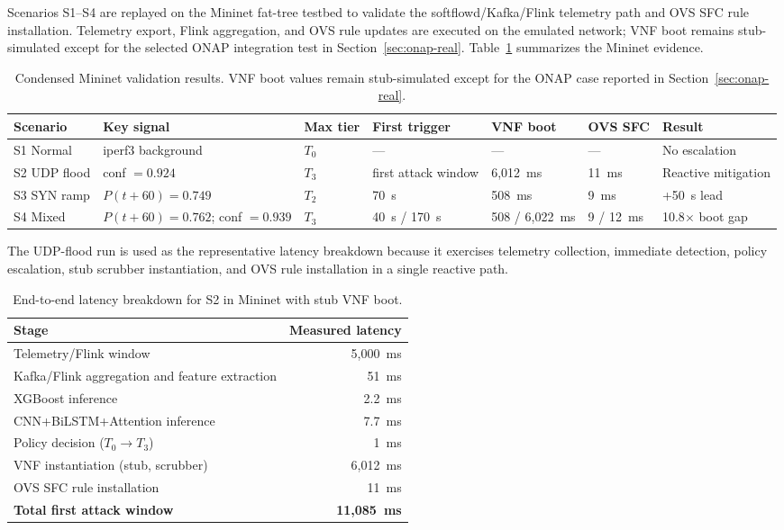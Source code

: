 \documentclass[12pt, a4paper, reqno, oneside]{book}
\begin{document}
Scenarios S1--S4 are replayed on the Mininet fat-tree testbed to validate the
softflowd/Kafka/Flink telemetry path and OVS SFC rule installation. Telemetry
export, Flink aggregation, and OVS rule updates are executed on the emulated
network; VNF boot remains stub-simulated except for the selected ONAP
integration test in Section~\ref{sec:onap-real}. Table~\ref{tab:mininet-validation-summary}
summarizes the Mininet evidence.

\begin{table}[H]
\centering
\small
\caption{Condensed Mininet validation results. VNF boot values remain
stub-simulated except for the ONAP case reported in Section~\ref{sec:onap-real}.}
\label{tab:mininet-validation-summary}
\begin{tabular}{@{}p{1.8cm}p{3.0cm}p{1.4cm}p{2.0cm}p{2.0cm}p{1.5cm}p{2.4cm}@{}}
\toprule
Scenario & Key signal & Max tier & First trigger & VNF boot & OVS SFC & Result \\
\midrule
S1 Normal & iperf3 background & $T_0$ & --- & --- & --- & No escalation \\
S2 UDP flood & conf $=0.924$ & $T_3$ & first attack window & 6{,}012~ms & 11~ms & Reactive mitigation \\
S3 SYN ramp & $P(t+60)=0.749$ & $T_2$ & 70~s & 508~ms & 9~ms & +50~s lead \\
S4 Mixed & $P(t+60)=0.762$; conf $=0.939$ & $T_3$ & 40~s / 170~s & 508 / 6{,}022~ms & 9 / 12~ms & 10.8$\times$ boot gap \\
\bottomrule
\end{tabular}
\end{table}

The UDP-flood run is used as the representative latency breakdown because it exercises telemetry collection, immediate detection, policy escalation, stub scrubber instantiation, and OVS rule installation in a single reactive path.

\begin{table}[H]
\centering
\small
\caption{End-to-end latency breakdown for S2 in Mininet with stub VNF boot.}
\label{tab:mininet-s2-latency}
\begin{tabular}{@{}lr@{}}
\toprule
Stage & Measured latency \\
\midrule
Telemetry/Flink window                & 5{,}000~ms \\
Kafka/Flink aggregation and feature extraction & 51~ms \\
XGBoost inference                     & 2.2~ms \\
CNN+BiLSTM+Attention inference        & 7.7~ms \\
Policy decision ($T_0 \to T_3$)       & 1~ms \\
VNF instantiation (stub, scrubber)    & 6{,}012~ms \\
OVS SFC rule installation             & 11~ms \\
\midrule
\textbf{Total first attack window}    & \textbf{11{,}085~ms} \\
\bottomrule
\end{tabular}
\end{table}
\end{document}

